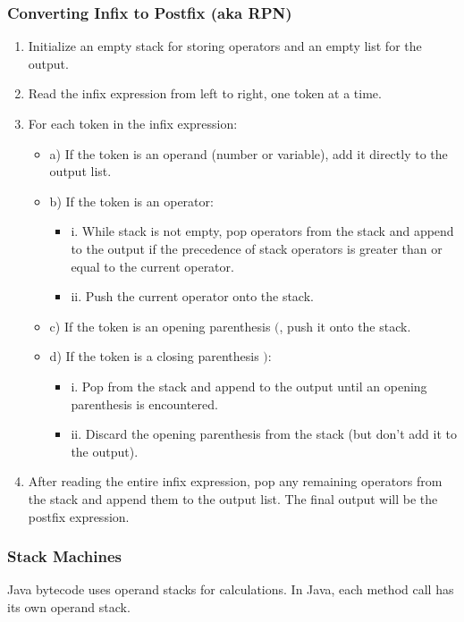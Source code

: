 \subsubsection{Converting Infix to Postfix (aka RPN)}
\begin{enumerate}
  \item Initialize an empty stack for storing operators and an empty list for the output.
  \item Read the infix expression from left to right, one token at a time.
  \item For each token in the infix expression:
    \begin{itemize}
      \item{a)} If the token is an operand (number or variable), add it directly to the output list.
      \item{b)} If the token is an operator:
        \begin{itemize}
          \item{i.} While stack is not empty, pop operators from the stack and append to the output if the
precedence of stack operators is greater than or equal to the current operator.
          \item{ii.} Push the current operator onto the stack.
        \end{itemize}
      \item{c)} If the token is an opening parenthesis $($, push it onto the stack.
      \item{d)} If the token is a closing parenthesis $)$:
        \begin{itemize}
          \item{i.} Pop from the stack and append to the output until an opening parenthesis is encountered.
          \item{ii.} Discard the opening parenthesis from the stack (but don't add it to the output).
        \end{itemize}
    \end{itemize}
  \item After reading the entire infix expression, pop any remaining operators from
the stack and append them to the output list. The final output will be the postfix
expression.
\end{enumerate}
\subsubsection{Stack Machines}

Java bytecode uses operand stacks for calculations.
In Java, each method call has its own operand stack.

